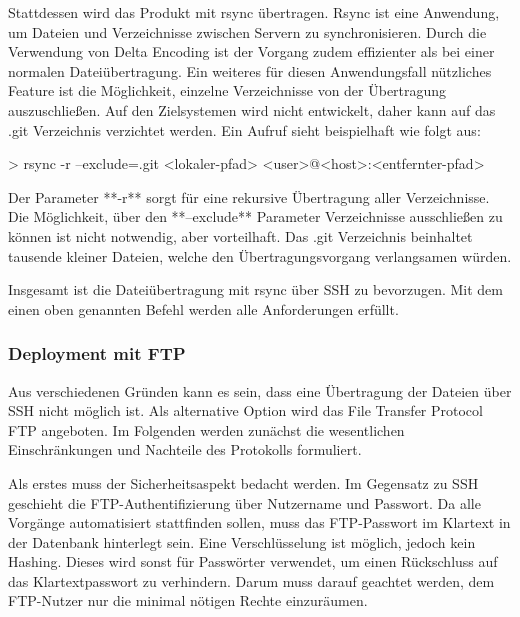 Stattdessen wird das Produkt mit rsync übertragen. Rsync ist eine Anwendung, um Dateien und Verzeichnisse zwischen Servern zu synchronisieren. Durch die Verwendung von Delta Encoding ist der Vorgang zudem effizienter als bei einer normalen Dateiübertragung. Ein weiteres für diesen Anwendungsfall nützliches Feature ist die Möglichkeit, einzelne Verzeichnisse von der Übertragung auszuschließen. Auf den Zielsystemen wird nicht entwickelt, daher kann auf das .git Verzeichnis verzichtet werden. Ein Aufruf sieht beispielhaft wie folgt aus:

> rsync -r --exclude=.git <lokaler-pfad> <user>@<host>:<entfernter-pfad>

Der Parameter **-r** sorgt für eine rekursive Übertragung aller Verzeichnisse. Die Möglichkeit, über den **--exclude** Parameter Verzeichnisse ausschließen zu können ist nicht notwendig, aber vorteilhaft. Das .git Verzeichnis beinhaltet tausende kleiner Dateien, welche den Übertragungsvorgang verlangsamen würden.

Insgesamt ist die Dateiübertragung mit rsync über SSH zu bevorzugen. Mit dem einen oben genannten Befehl werden alle Anforderungen erfüllt.


\subsubsection{Deployment mit FTP} %
\label{ssub:deployment_mit_ftp}

Aus verschiedenen Gründen kann es sein, dass eine Übertragung der Dateien über SSH nicht möglich ist. Als alternative Option wird das File Transfer Protocol FTP angeboten. Im Folgenden werden zunächst die wesentlichen Einschränkungen und Nachteile des Protokolls formuliert.

Als erstes muss der Sicherheitsaspekt bedacht werden. Im Gegensatz zu SSH geschieht die FTP-Authentifizierung über Nutzername und Passwort. Da alle Vorgänge automatisiert stattfinden sollen, muss das FTP-Passwort im Klartext in der Datenbank hinterlegt sein. Eine Verschlüsselung ist möglich, jedoch kein Hashing. Dieses wird sonst für Passwörter verwendet, um einen Rückschluss auf das Klartextpasswort zu verhindern. Darum muss darauf geachtet werden, dem FTP-Nutzer nur die minimal nötigen Rechte einzuräumen.

